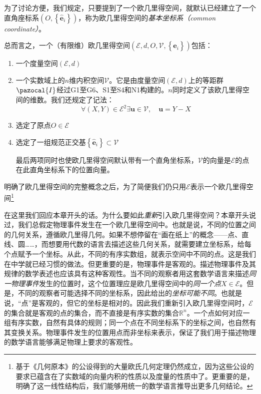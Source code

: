 \documentclass[../main.tex]{subfiles}
\begin{document}
为了讨论方便，我们规定，只要提到了一个欧几里得空间，就默认已经建立了一个直角座标系$\left(O,\left\{\mathbf{\hat{e}}_i\right\}\right)$，称为欧几里得空间的\emph{基本坐标系（common coordinate）}。


总而言之，一个（有限维）欧几里得空间$\left(\mathcal{E},d,O,\mathcal{V},\left\{\mathbf{\hat{e}}_i\right\}\right)$包括：
\begin{enumerate}
    \item 一个度量空间$\left(\mathcal{E},d\right)$
    \item 一个实数域上的$n$维内积空间$\mathcal{V}$。它是由度量空间$\left(\mathcal{E},d\right)$上的等距群$\pazocal{I}$经过G1至G6、S1至S4和N1构建的。$n$同时定义了该欧几里得空间的维数。我们还规定了记法：
          \[\forall\left(X,Y\right)\in\mathcal{E}^2\exists\mathbf{u}\in\mathcal{V},\quad\mathbf{u}=Y-X\]
    \item 选定了原点$O\in\mathcal{E}$
    \item 选定了一组规范正交基$\left\{\mathbf{\hat{e}}_i\right\}\subset\mathcal{V}$

          最后两项同时也使欧几里得空间默认带有一个直角坐标系，$\mathcal{V}$的向量是$\mathcal{E}$的点在此直角坐标系下的位置向量。
\end{enumerate}

明确了欧几里得空间的完整概念之后，为了简便我们仍只用$\mathcal{E}$表示一个欧几里得空间\footnote{基于《几何原本》的公设得到的大量欧氏几何定理仍然成立，因为这些公设的要求已蕴含在了实数域的向量内积的性质以及度量的性质中了\cite{Audin2002}。更重要的是，明确了这一线性结构后，我们能够用统一的数学语言推导出更多几何结论\cite{Berger1987}。}

在这里我们回应本章开头的话。为什么要如此\emph{重新}引入欧几里得空间？本章开头说过，我们总假定物理事件发生在一个欧几里得空间中。也就是说，不同的位置之间的几何关系，遵循欧几里得几何。如果不想停留在“画在纸上”的概念——点、直线、圆……，而想要用代数的语言去描述这些几何关系，就需要建立坐标系，给每个点赋予一个坐标。从此，不同的有序实数组，就表示空间中不同的点。这是我们在中学就已经习惯的做法。但更重要的是，物理事件是客观的。描述物理事件及其规律的数学表述也应该具有这种客观性。当不同的观察者用这套数学语言来描述\emph{同一物理事件}发生的位置时，这个位置理应是欧几里得空间中的\emph{同一个点}$X\in\mathcal{E}$。但是，不同的观察者可能选择不同的坐标系，因此给出的\emph{坐标可能不同}。也就是说，“点”是客观的，但它的坐标是相对的。因此我们重新引入欧几里得空间时，$\mathcal{E}$的集合就是客观的点的集合，而不直接是有序实数的集合$\mathbb{R}^n$。一个点如何对应一组有序实数，自然有具体的规则；同一个点在不同坐标系下的坐标之间，也自然有其变换关系。物理事件发生的位置用点而非坐标来表示，保证了我们用于描述物理的数学语言能够满足物理上要求的客观性。
\end{document}
